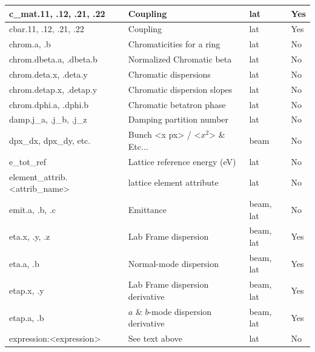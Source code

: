 {\begin{longtable}{llll}
  c_mat.11, .12, .21, .22             & Coupling                                  & lat         & Yes \\ \hline 
  cbar.11, .12, .21, .22              & Coupling                                  & lat         & Yes \\ \hline 
  chrom.a, .b                         & Chromaticities for a ring                 & lat         & No  \\ \hline
  chrom.dbeta.a, .dbeta.b             & Normalized Chromatic beta                 & lat         & No  \\ \hline
  chrom.deta.x, .deta.y               & Chromatic dispersions                     & lat         & No  \\ \hline
  chrom.detap.x, .detap.y             & Chromatic dispersion slopes               & lat         & No  \\ \hline
  chrom.dphi.a, .dphi.b               & Chromatic betatron phase                  & lat         & No  \\ \hline

  damp.j_a, .j_b, .j_z                & Damping partition number                  & lat         & No  \\ \hline
  dpx_dx, dpx_dy, etc.                & Bunch <x px> / <$x^2$> \& Etc...          & beam        & No  \\ \hline 

  e_tot_ref                           & Lattice reference energy (eV)             & lat         & No \\ \hline
  element_attrib.<attrib_name>        & lattice element attribute                 & lat         & No  \\ \hline
  emit.a, .b, .c                      & Emittance                                 & beam, lat   & No  \\ \hline
  eta.x, .y, .z                       & Lab Frame dispersion                      & beam, lat   & Yes \\ \hline 
  eta.a, .b                           & Normal-mode dispersion                    & beam, lat   & Yes \\ \hline 
  etap.x, .y                          & Lab Frame dispersion derivative           & beam, lat   & Yes \\ \hline 
  etap.a, .b                          & $a$ \& $b$-mode dispersion derivative     & beam, lat   & Yes \\ \hline 
  expression:<expression>             & See text above                            & lat         & No  \\ \hline 


\end{longtable}}
